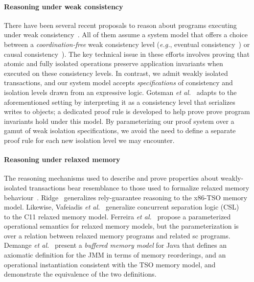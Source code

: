 \paragraph{Reasoning under weak consistency} There have been several
recent proposals to reason about programs executing under weak
consistency~\cite{bailisvldb, alvarocalm, gotsmanpopl16,redblueatc,
  redblueosdi, ecinec}. All of them assume a system model that offers
a choice between a \emph{coordination-free} weak consistency level
(\emph{e.g.}, eventual consistency~\cite{redblueosdi, redblueatc,
  ecinec, alvarocalm, bailisvldb}) or causal
consistency~\cite{LBC16,gotsmanpopl16}). The key technical issue in
these efforts involves proving that atomic and fully isolated
operations preserve application invariants when executed on these
consistency levels.  In contrast, we admit weakly isolated
transactions, and our system model accepts \emph{specifications} of
consistency and isolation levels drawn from an expressive logic.
Gotsman \emph{et al.}~\cite{gotsmanpopl16} adapts  to the aforementioned setting by interpreting it
as a consistency level that serializes writes to objects; a dedicated
proof rule is developed to help prove prove program invariants hold
under this model. By parameterizing our proof system over a gamut of
weak isolation specifications, we avoid the need to define a separate
proof rule for each new isolation level we may encounter.

\paragraph{Reasoning under relaxed memory} The reasoning mechanisms
used to describe and prove properties about weakly-isolated
transactions bear resemblance to those used to formalize relaxed
memory behaviour~\cite{battycpp}.  Ridge~\cite{rgtso} generalizes
rely-guarantee reasoning to the x86-TSO memory model.  Likewise,
Vafeiadis \emph{et al.}~\cite{rsl13} generalize concurrent separation
logic (CSL)~\cite{csl} to the C11 relaxed memory model.  Ferreira
\emph{et al.}~\cite{ferreira10} propose a parameterized operational
semantics for relaxed memory models, but the parameterization is over
a relation between relaxed memory programs and related {\sc sc}
programs. Demange \emph{et al.}~\cite{DLZ+13} present a \emph{buffered
  memory model} for Java that defines an axiomatic definition for the
JMM in terms of memory reorderings, and an operational instantiation
consistent with the TSO memory model, and demonstrate the equivalence
of the two definitions.  

